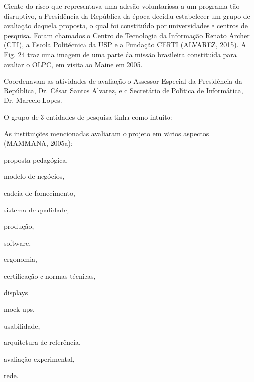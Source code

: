 \documentclass[
12pt,		%
openright,	%
twoside,  %
a4paper,			%
chapter=TITLE,		%
english,			%
french,				%
spanish,			%
brazil				%
]{USPSC-classe/USPSC}
\begin{document}
Ciente do risco que representava uma ades\~ao voluntariosa a um programa t\~ao disruptivo, a Presid\^encia da Rep\'ublica da \'epoca decidiu estabelecer um grupo de avalia\c{c}\~ao  daquela proposta, o  qual foi constitu\'{\i}do por universidades e centros de pesquisa. Foram chamados o Centro de Tecnologia da Informa\c{c}\~ao Renato Archer (CTI), a Escola Polit\'ecnica da USP e a Funda\c{c}\~ao CERTI (ALVAREZ, 2015). A Fig. 24 traz uma imagem de uma parte da miss\~ao brasileira constitu\'{\i}da para avaliar o OLPC, em visita ao Maine em 2005.








Coordenavam as atividades de avalia\c{c}\~ao o Assessor Especial da Presid\^encia da Rep\'ublica, Dr. C\'esar Santos Alvarez, e o Secret\'ario de Pol\'{\i}tica de Inform\'atica, Dr. Marcelo Lopes.








O grupo de 3 entidades de pesquisa tinha como intuito:









\noindent\begin{center}\mbox{\centering{}}\end{center}


As institui\c{c}\~oes mencionadas avaliaram o projeto em v\'arios aspectos  (MAMMANA, 2005a):









\begin{alineas}
\item proposta pedag\'ogica,
\item modelo de neg\'ocios,
\item cadeia de fornecimento,
\item sistema de qualidade,
\item produ\c{c}\~ao,
\item software,
\item ergonomia,
\item certifica\c{c}\~ao e normas t\'ecnicas,
\item displays
\item mock-ups,
\item usabilidade,
\item arquitetura de refer\^encia,
\item avalia\c{c}\~ao experimental,
\item rede.
\end{alineas}
\end{document}
